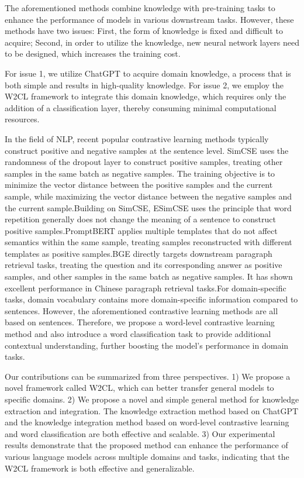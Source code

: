 The aforementioned methods combine knowledge with pre-training tasks to enhance the performance of models in various downstream tasks. However, these methods have two issues: First, the form of knowledge is fixed and difficult to acquire; Second, in order to utilize the knowledge, new neural network layers need to be designed, which increases the training cost.

For issue 1, we utilize ChatGPT to acquire domain knowledge, a process that is both simple and results in high-quality knowledge. For issue 2, we employ the W2CL framework to integrate this domain knowledge, which requires only the addition of a classification layer, thereby consuming minimal computational resources.

In the field of NLP, recent popular contrastive learning methods typically construct positive and negative samples at the sentence level. SimCSE\cite{simcse} uses the randomness of the dropout layer to construct positive samples, treating other samples in the same batch as negative samples. The training objective is to minimize the vector distance between the positive samples and the current sample, while maximizing the vector distance between the negative samples and the current sample.Building on SimCSE, ESimCSE\cite{esimcse} uses the principle that word repetition generally does not change the meaning of a sentence to construct positive samples.PromptBERT\cite{promptbert} applies multiple templates that do not affect semantics within the same sample, treating samples reconstructed with different templates as positive samples.BGE\cite{bge} directly targets downstream paragraph retrieval tasks, treating the question and its corresponding answer as positive samples, and other samples in the same batch as negative samples. It has shown excellent performance in Chinese paragraph retrieval tasks.For domain-specific tasks, domain vocabulary contains more domain-specific information compared to sentences. However, the aforementioned contrastive learning methods are all based on sentences. Therefore, we propose a word-level contrastive learning method and also introduce a word classification task to provide additional contextual understanding, further boosting the model's performance in domain tasks.

Our contributions can be summarized from three perspectives. 1) We propose a novel framework called W2CL, which can better transfer general models to specific domains. 2) We propose a novel and simple general method for knowledge extraction and integration. The knowledge extraction method based on ChatGPT and the knowledge integration method based on word-level contrastive learning and word classification are both effective and scalable. 3) Our experimental results demonstrate that the proposed method can enhance the performance of various language models across multiple domains and tasks, indicating that the W2CL framework is both effective and generalizable.


